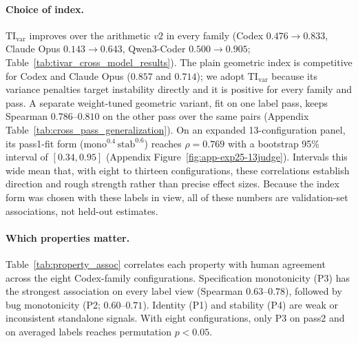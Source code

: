 \paragraph{Choice of index.}
\(\mathrm{TI}_{\mathrm{var}}\) improves over the arithmetic \(v2\) in every family (Codex \(0.476\!\rightarrow\!0.833\), Claude Opus \(0.143\!\rightarrow\!0.643\), Qwen3-Coder \(0.500\!\rightarrow\!0.905\); Table~\ref{tab:tivar_cross_model_results}).
The plain geometric index is competitive for Codex and Claude Opus (\(0.857\) and \(0.714\)); we adopt \(\mathrm{TI}_{\mathrm{var}}\) because its variance penalties target instability directly and it is positive for every family and pass.
A separate weight-tuned geometric variant, fit on one label pass, keeps Spearman \(0.786\)--\(0.810\) on the other pass over the same pairs (Appendix Table~\ref{tab:cross_pass_generalization}).
On an expanded 13-configuration panel, its pass1-fit form (\(\text{mono}^{0.4}\,\text{stab}^{0.6}\)) reaches \(\rho=0.769\) with a bootstrap 95\% interval of \([0.34, 0.95]\) (Appendix Figure~\ref{fig:app-exp25-13judge}).
Intervals this wide mean that, with eight to thirteen configurations, these correlations establish direction and rough strength rather than precise effect sizes.
Because the index form was chosen with these labels in view, all of these numbers are validation-set associations, not held-out estimates.

\paragraph{Which properties matter.}
Table~\ref{tab:property_assoc} correlates each property with human agreement across the eight Codex-family configurations.
Specification monotonicity (P3) has the strongest association on every label view (Spearman \(0.63\)--\(0.78\)), followed by bug monotonicity (P2; \(0.60\)--\(0.71\)).
Identity (P1) and stability (P4) are weak or inconsistent standalone signals.
With eight configurations, only P3 on pass2 and on averaged labels reaches permutation \(p<0.05\).

